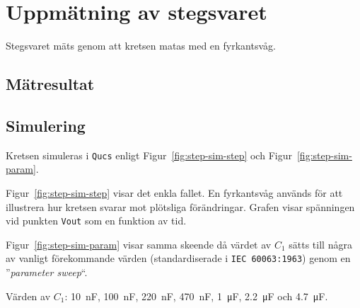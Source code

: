 %
%

\section{Uppmätning av stegsvaret}\label{step}
Stegsvaret mäts genom att kretsen matas med en fyrkantsvåg.

\subsection{Mätresultat}\label{}


\subsection{Simulering}\label{}
Kretsen simuleras i \texttt{Qucs} enligt Figur~\ref{fig:step-sim-step} och
Figur~\ref{fig:step-sim-param}.

Figur~\ref{fig:step-sim-step} visar det enkla fallet. En fyrkantsvåg används
för att illustrera hur kretsen svarar mot plötsliga förändringar. Grafen visar
spänningen vid punkten \texttt{Vout} som en funktion av tid.

Figur~\ref{fig:step-sim-param} visar samma skeende då värdet av $C_1$ sätts
till några av vanligt förekommande värden (standardiserade i \texttt{IEC
60063:1963}) genom en ''\emph{parameter sweep}``.  \par 
Värden av $C_1$: \SI{10}{\nano\farad},  \SI{100}{\nano\farad},
                 \SI{220}{\nano\farad}, \SI{470}{\nano\farad}, 
                 \SI{1}{\micro\farad},  \SI{2.2}{\micro\farad} 
             och \SI{4.7}{\micro\farad}.


